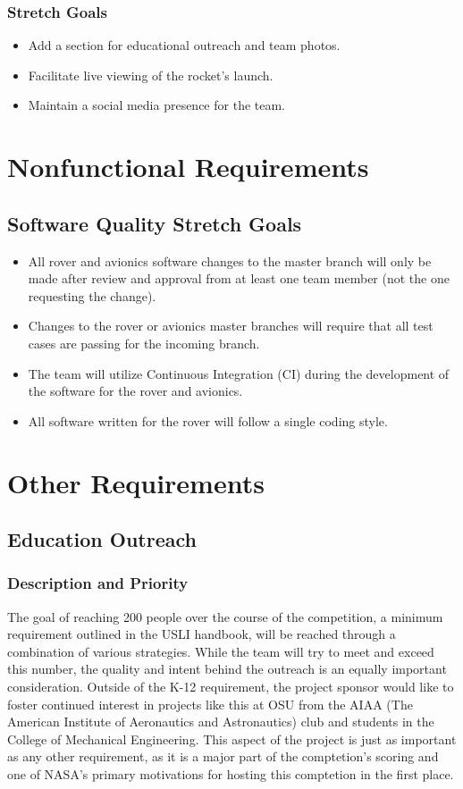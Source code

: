 \documentclass[onecolumn, draftclsnofoot, 10pt, compsoc]{IEEEtran}
\begin{document}
\subsubsection{Stretch Goals}
\begin{itemize}
\item Add a section for educational outreach and team photos.
\item Facilitate live viewing of the rocket's launch.
\item Maintain a social media presence for the team. 
\end{itemize}

\section{Nonfunctional Requirements}

\subsection{Software Quality Stretch Goals}
\begin{itemize}
\item All rover and avionics software changes to the master branch will only be made after review and approval from at least one team member (not the one requesting the change).
\item Changes to the rover or avionics master branches will require that all test cases are passing for the incoming branch.
\item The team will utilize Continuous Integration (CI) during the development of the software for the rover and avionics.
\item All software written for the rover will follow a single coding style.
\end{itemize}

\section{Other Requirements}
\subsection{Education Outreach}
\subsubsection{Description and Priority}
The goal of reaching 200 people over the course of the competition, a minimum requirement outlined in the USLI handbook, will be reached through a combination of various strategies. While the team will try to meet and exceed this number, the quality and intent behind the outreach is an equally important consideration. Outside of the K-12 requirement, the project sponsor would like to foster continued interest in projects like this at OSU from the AIAA (The American Institute of Aeronautics and Astronautics) club and students in the College of Mechanical Engineering. This aspect of the project is just as important as any other requirement, as it is a major part of the comptetion's scoring and one of NASA's primary motivations for hosting this comptetion in the first place. 
\end{document}
